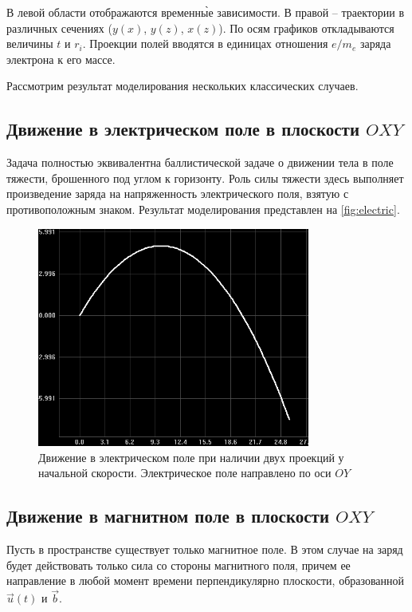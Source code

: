\documentclass[12pt,a4paper]{article}
\begin{document}
В левой области отображаются временн\`{ы}е зависимости. В правой -- траектории в различных сечениях ($y(x)$, $y(z)$, $x(z)$). По осям графиков откладываются величины $t$ и $r_i$. Проекции полей вводятся в единицах отношения $e / m_e$ заряда электрона к его массе.

Рассмотрим результат моделирования нескольких классических случаев.

\subsection{Движение в электрическом поле в плоскости $OXY$}

Задача полностью эквивалентна баллистической задаче о движении тела в поле тяжести, брошенного под углом к горизонту. Роль силы тяжести здесь выполняет произведение заряда на напряженность электрического поля, взятую с противоположным знаком. Результат моделирования представлен на \autoref{fig:electric}.

\begin{figure}[h]%
\centering
\includegraphics[width=0.8\textwidth]{electric}%
\caption[Движение в электрическом поле]{Движение в электрическом поле при наличии двух проекций у начальной скорости. Электрическое поле направлено по оси $OY$}%
\label{fig:electric}%
\end{figure}

\subsection{Движение в магнитном поле в плоскости $OXY$}

Пусть в пространстве существует только магнитное поле. В этом случае на заряд будет действовать только сила со стороны магнитного поля, причем ее направление в любой момент времени перпендикулярно плоскости, образованной $\vec{u}(t)$ и $\vec{b}$.
\end{document}
